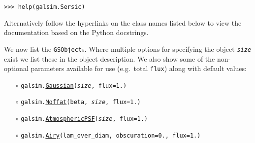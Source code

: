 \documentclass[preprint,11pt]{../../devel/modules/aastex}
\begin{document}
{\tt >>> help(galsim.Sersic)}

Alternatively follow the hyperlinks on
the class names listed below to view the documentation based
on the Python docstrings.

We now list the \texttt{GSObject}s.
Where multiple options for specifying the object \emph{\texttt{size}}
exist we list these in the object description. We also show some of the non-optional
parameters available for use (e.g.\ total \texttt{flux}) along with default values:
\begin{itemize}
\item[$\circ$]
  \texttt{galsim.}\href{http://galsim-developers.github.com/GalSim/classgalsim_1_1base_1_1_gaussian.html}{\texttt{Gaussian}}\texttt{(\emph{size}, flux=1.)}
\item[$\circ$]
  \texttt{galsim.}\href{http://galsim-developers.github.com/GalSim/classgalsim_1_1base_1_1_moffat.html}{\texttt{Moffat}}\texttt{(beta, \emph{size}, flux=1.)}
\item[$\circ$]
  \texttt{galsim.}\href{http://galsim-developers.github.com/GalSim/classgalsim_1_1base_1_1_atmospheric_p_s_f.html}{\texttt{AtmosphericPSF}}\texttt{(\emph{size}, flux=1.)}
\item[$\circ$]
  \texttt{galsim.}\href{http://galsim-developers.github.com/GalSim/classgalsim_1_1base_1_1_airy.html}{\texttt{Airy}}\texttt{(lam\_over\_diam, obscuration=0., flux=1.)}
\end{itemize}
\end{document}
